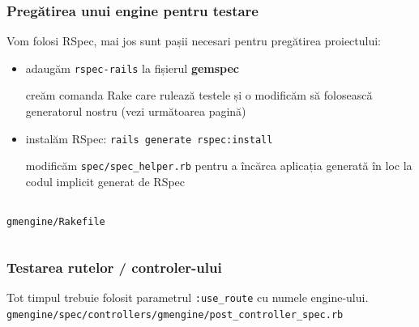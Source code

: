 \documentclass[compress]{beamer}
\begin{document}
\begin{frame}
\frametitle{Pregătirea unui engine pentru testare}

Vom folosi RSpec, mai jos sunt pașii necesari pentru pregătirea proiectului:
\begin{itemize}
  \item adaugăm \texttt{rspec-rails} la fișierul \textbf{gemspec}
    \begin{item}
      creăm comanda Rake care rulează testele și o modificăm să folosească generatorul nostru
      (vezi următoarea pagină)
    \end{item}
  \item instalăm RSpec: \texttt{rails generate rspec:install}
  \begin{item}
    modificăm \texttt{spec/spec\_helper.rb} pentru a încărca aplicația generată în loc la codul implicit generat de RSpec
    \inputminted[fontsize=\tiny,gobble=0,linenos=true,firstline=3,lastline=7]{ruby}{code/gmengine/spec/spec_helper.rb}
  \end{item}
\end{itemize}
\end{frame}

\begin{frame}
  \texttt{gmengine/Rakefile}
  \inputminted[fontsize=\tiny,gobble=0,linenos=true,firstline=26,lastline=0]{ruby}{code/gmengine/Rakefile}
\end{frame}

\begin{frame}
\frametitle{Testarea rutelor / controler-ului}
  Tot timpul trebuie folosit parametrul \texttt{:use\_route} cu numele engine-ului.
  \\
  \small\texttt{gmengine/spec/controllers/gmengine/post\_controller\_spec.rb}
  \inputminted[fontsize=\tiny,gobble=0,linenos=true,firstline=0,lastline=0]{ruby}{code/gmengine/spec/controllers/gmengine/posts_controller_spec.rb}
\end{frame}
\end{document}

